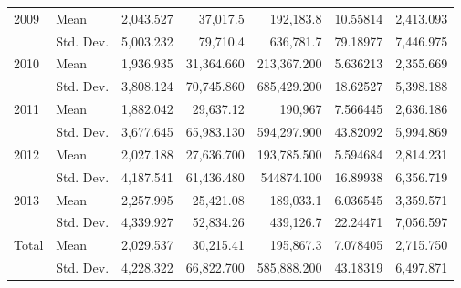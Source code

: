 \documentclass[11pt,a4paper,oneside]{article}
\begin{document}
\begin{table}[htbp]
{\begin{threeparttable}
\begin{tabular}{rlrrrrr}
    \midrule
    \multicolumn{1}{l}{2009} & Mean  & 2,043.527 & 37,017.5 & 192,183.8 & 10.55814 & 2,413.093 \\
          & Std. Dev. & 5,003.232 & 79,710.4 & 636,781.7 & 79.18977 & 7,446.975 \\
    \midrule
    \multicolumn{1}{l}{2010} & Mean  & 1,936.935 & 31,364.660 & 213,367.200 & 5.636213 & 2,355.669 \\
          & Std. Dev. & 3,808.124 & 70,745.860 & 685,429.200 & 18.62527 & 5,398.188 \\
    \midrule
    \multicolumn{1}{l}{2011} & Mean  & 1,882.042 & 29,637.12 & 190,967 & 7.566445 & 2,636.186 \\
          & Std. Dev. & 3,677.645 & 65,983.130 & 594,297.900 & 43.82092 & 5,994.869 \\
    \midrule
    \multicolumn{1}{l}{2012} & Mean  & 2,027.188 & 27,636.700 & 193,785.500 & 5.594684 & 2,814.231 \\
          & Std. Dev. & 4,187.541 & 61,436.480 & 544874.100 & 16.89938 & 6,356.719 \\
    \midrule
    \multicolumn{1}{l}{2013} & Mean  & 2,257.995 & 25,421.08 & 189,033.1 & 6.036545 & 3,359.571 \\
          & Std. Dev. & 4,339.927 & 52,834.26 & 439,126.7 & 22.24471 & 7,056.597 \\
    \midrule
    \multicolumn{1}{l}{Total} & Mean  & 2,029.537 & 30,215.41 & 195,867.3 & 7.078405 & 2,715.750 \\
          & Std. Dev. & 4,228.322 & 66,822.700 & 585,888.200 & 43.18319 & 6,497.871 \\

\end{tabular}
\end{threeparttable}}
\end{table}
\end{document}
